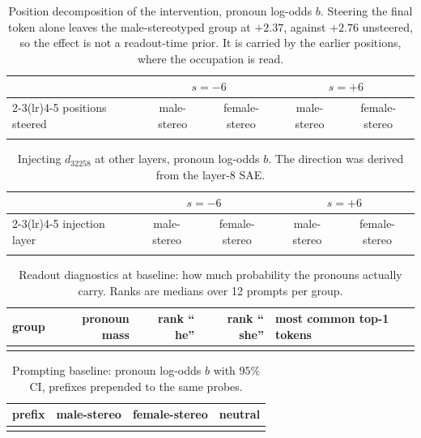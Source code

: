 \documentclass{article}
\begin{document}
\begin{table}[h]
\centering
\caption{Position decomposition of the intervention, pronoun log-odds $b$. Steering the
final token alone leaves the male-stereotyped group at $+2.37$, against $+2.76$ unsteered,
so the effect is not a readout-time prior. It is carried by the earlier positions, where
the occupation is read.}
\label{tab:position}
\small
\begin{tabular}{lcccc}
\toprule
& \multicolumn{2}{c}{$s=-6$} & \multicolumn{2}{c}{$s=+6$} \\
\cmidrule(lr){2-3}\cmidrule(lr){4-5}
positions steered & male-stereo & female-stereo & male-stereo & female-stereo \\
\midrule
 \\
\bottomrule
\end{tabular}
\end{table}

\begin{table}[h]
\centering
\caption{Injecting $d_{32258}$ at other layers, pronoun log-odds $b$. The direction was
derived from the layer-8 SAE.}
\label{tab:layer}
\small
\begin{tabular}{lcccc}
\toprule
& \multicolumn{2}{c}{$s=-6$} & \multicolumn{2}{c}{$s=+6$} \\
\cmidrule(lr){2-3}\cmidrule(lr){4-5}
injection layer & male-stereo & female-stereo & male-stereo & female-stereo \\
\midrule
 \\
\bottomrule
\end{tabular}
\end{table}

\begin{table}[h]
\centering
\caption{Readout diagnostics at baseline: how much probability the pronouns actually
carry. Ranks are medians over 12 prompts per group.}
\label{tab:readout}
\small
\begin{tabular}{lrrrl}
\toprule
group & pronoun mass & rank `` he'' & rank `` she'' & most common top-1 tokens \\
\midrule
 \\
\bottomrule
\end{tabular}
\end{table}

\begin{table}[h]
\centering
\caption{Prompting baseline: pronoun log-odds $b$ with $95\%$ CI, prefixes prepended to
the same probes.}
\label{tab:prompting}
\footnotesize
\setlength{\tabcolsep}{4pt}
\begin{tabular}{llll}
\toprule
prefix & male-stereo & female-stereo & neutral \\
\midrule
 \\
\bottomrule
\end{tabular}
\end{table}
\end{document}
